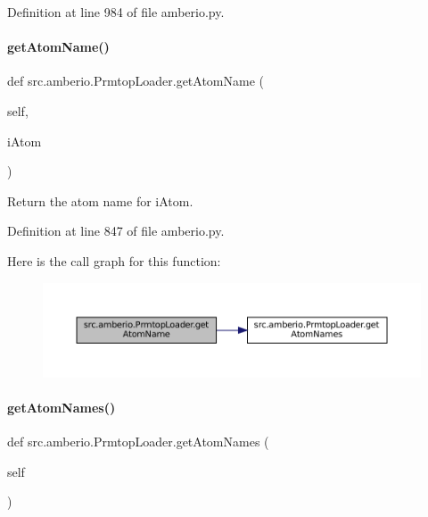 Definition at line 984 of file amberio.\+py.

\mbox{\label{classsrc_1_1amberio_1_1PrmtopLoader_aea4f3d9a8ea0133d6dbb40539ed00eee}} 
\paragraph{\texorpdfstring{get\+Atom\+Name()}{getAtomName()}}
{\footnotesize\ttfamily def src.\+amberio.\+Prmtop\+Loader.\+get\+Atom\+Name (\begin{DoxyParamCaption}\item[{}]{self,  }\item[{}]{i\+Atom }\end{DoxyParamCaption})}



Return the atom name for i\+Atom. 



Definition at line 847 of file amberio.\+py.

Here is the call graph for this function\+:
\nopagebreak
\begin{figure}[H]
\begin{center}
\leavevmode
\includegraphics[width=350pt]{classsrc_1_1amberio_1_1PrmtopLoader_aea4f3d9a8ea0133d6dbb40539ed00eee_cgraph}
\end{center}
\end{figure}
\mbox{\label{classsrc_1_1amberio_1_1PrmtopLoader_ac95dc64ec362f33810c3a830675b3f8a}} 
\paragraph{\texorpdfstring{get\+Atom\+Names()}{getAtomNames()}}
{\footnotesize\ttfamily def src.\+amberio.\+Prmtop\+Loader.\+get\+Atom\+Names (\begin{DoxyParamCaption}\item[{}]{self }\end{DoxyParamCaption})}



